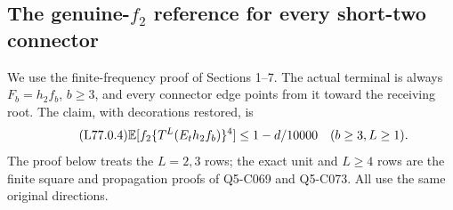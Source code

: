 \subsection{The genuine-$f_2$ reference for every short-two connector}\label{proof:Q5-C077}
We use the finite-frequency proof of Sections 1--7. The actual terminal is always $F_b=h_2f_b$, $b\ge3$, and
every connector edge points from it toward the receiving root.
The claim, with decorations restored, is
\begin{equation}\tag{L77.0.4}\label{eq:L77:claim}
\mathbb E[f_2\{T^L(E_t h_2f_b)\}^4]\le1-d/10000
\quad(b\ge3,L\ge1).
\end{equation}
The proof below treats the $L=2,3$ rows; the exact unit and
$L\ge4$ rows are the finite square and propagation proofs of
Q5-C069 and Q5-C073. All use the same original directions.


